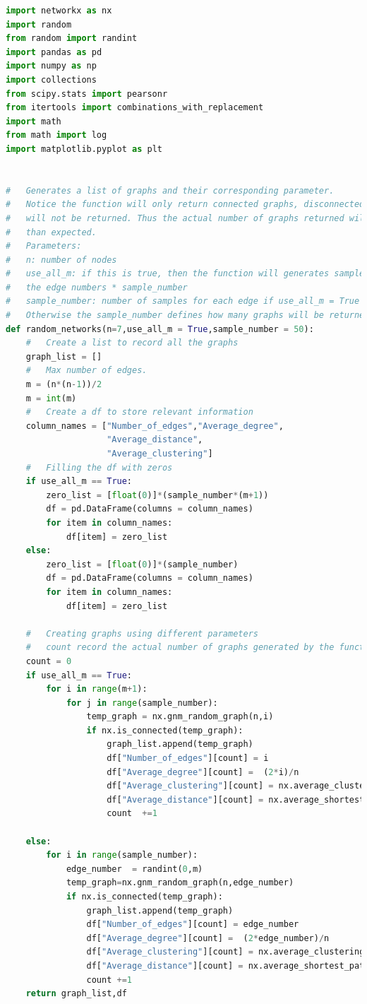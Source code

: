 \documentclass[12pt]{article}
\begin{document}
\begin{lstlisting}[language=Python,breaklines=true]
import networkx as nx
import random
from random import randint
import pandas as pd
import numpy as np
import collections
from scipy.stats import pearsonr
from itertools import combinations_with_replacement
import math
from math import log
import matplotlib.pyplot as plt


#   Generates a list of graphs and their corresponding parameter.
#   Notice the function will only return connected graphs, disconnected graphs
#   will not be returned. Thus the actual number of graphs returned will be less
#   than expected.
#   Parameters:
#   n: number of nodes
#   use_all_m: if this is true, then the function will generates samples using all
#   the edge numbers * sample_number
#   sample_number: number of samples for each edge if use_all_m = True
#   Otherwise the sample_number defines how many graphs will be returned in total
def random_networks(n=7,use_all_m = True,sample_number = 50):
    #   Create a list to record all the graphs
    graph_list = []
    #   Max number of edges.
    m = (n*(n-1))/2
    m = int(m)
    #   Create a df to store relevant information
    column_names = ["Number_of_edges","Average_degree",
                    "Average_distance",
                    "Average_clustering"]
    #   Filling the df with zeros
    if use_all_m == True:
        zero_list = [float(0)]*(sample_number*(m+1))
        df = pd.DataFrame(columns = column_names)
        for item in column_names:
            df[item] = zero_list 
    else:
        zero_list = [float(0)]*(sample_number)
        df = pd.DataFrame(columns = column_names)
        for item in column_names:
            df[item] = zero_list 
    
    #   Creating graphs using different parameters
    #   count record the actual number of graphs generated by the function
    count = 0
    if use_all_m == True:
        for i in range(m+1):
            for j in range(sample_number):
                temp_graph = nx.gnm_random_graph(n,i)
                if nx.is_connected(temp_graph):
                    graph_list.append(temp_graph)
                    df["Number_of_edges"][count] = i
                    df["Average_degree"][count] =  (2*i)/n
                    df["Average_clustering"][count] = nx.average_clustering(temp_graph)
                    df["Average_distance"][count] = nx.average_shortest_path_length(temp_graph)
                    count  +=1

    else:
        for i in range(sample_number):
            edge_number  = randint(0,m)
            temp_graph=nx.gnm_random_graph(n,edge_number)
            if nx.is_connected(temp_graph):
                graph_list.append(temp_graph)
                df["Number_of_edges"][count] = edge_number
                df["Average_degree"][count] =  (2*edge_number)/n
                df["Average_clustering"][count] = nx.average_clustering(temp_graph)
                df["Average_distance"][count] = nx.average_shortest_path_length(temp_graph)
                count +=1
    return graph_list,df



\end{lstlisting}
\end{document}
